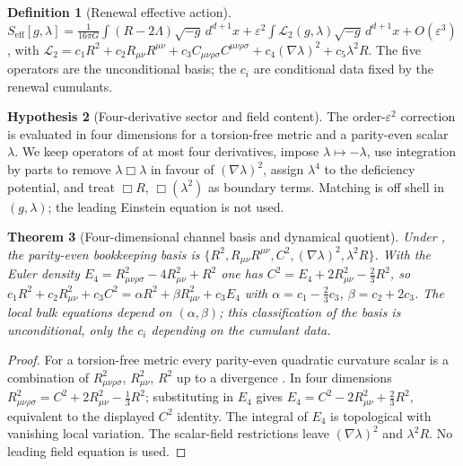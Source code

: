 \documentclass[11pt]{article}
\newtheorem{theorem}{Theorem}[section]
\theoremstyle{definition}
\newtheorem{definition}[theorem]{Definition}
\newtheorem{hypothesis}[theorem]{Hypothesis}
\theoremstyle{remark}
\newcommand{\eps}{\varepsilon}
\newcommand{\Lcal}{\mathcal L}
\newcommand{\eff}{\mathrm{eff}}
\begin{document}
\begin{definition}[Renewal effective action]
\label{def:effective-action}
$S_{\eff}[g,\lambda]=\tfrac1{16\pi G}\int(R-2\Lambda)\sqrt{-g}\,d^{d+1}x
+\eps^2\int\Lcal_2(g,\lambda)\sqrt{-g}\,d^{d+1}x+O(\eps^3)$, with
$\Lcal_2=c_1R^2+c_2R_{\mu\nu}R^{\mu\nu}+c_3C_{\mu\nu\rho\sigma}C^{\mu\nu\rho\sigma}
+c_4(\nabla\lambda)^2+c_5\lambda^2R$.  The five operators are the unconditional
basis; the $c_i$ are conditional data fixed by the renewal cumulants.
\end{definition}

\begin{hypothesis}[Four-derivative sector and field content]
\label{hyp:four-derivative-sector}
The order-$\eps^2$ correction is evaluated in four dimensions for a torsion-free
metric and a parity-even scalar $\lambda$.  We keep operators of at most four
derivatives, impose $\lambda\mapsto-\lambda$, use integration by parts to remove
$\lambda\Box\lambda$ in favour of $(\nabla\lambda)^2$, assign $\lambda^4$ to the
deficiency potential, and treat $\Box R$, $\Box(\lambda^2)$ as boundary terms.
Matching is off shell in $(g,\lambda)$; the leading Einstein equation is not used.
\end{hypothesis}

\begin{theorem}[Four-dimensional channel basis and dynamical quotient]
\label{thm:basis}
Under , the parity-even bookkeeping basis is
$\{R^2,R_{\mu\nu}R^{\mu\nu},C^2,(\nabla\lambda)^2,\lambda^2R\}$.  With the Euler
density $E_4=R_{\mu\nu\rho\sigma}^2-4R_{\mu\nu}^2+R^2$ one has
$C^2=E_4+2R_{\mu\nu}^2-\tfrac23R^2$, so
$c_1R^2+c_2R_{\mu\nu}^2+c_3C^2=\alpha R^2+\beta R_{\mu\nu}^2+c_3E_4$ with
$\alpha=c_1-\tfrac23c_3$, $\beta=c_2+2c_3$.  The local bulk equations depend on
$(\alpha,\beta)$; this classification of the basis is unconditional, only the $c_i$
depending on the cumulant data.
\end{theorem}

\begin{proof}
For a torsion-free metric every parity-even quadratic curvature scalar is a
combination of $R_{\mu\nu\rho\sigma}^2$, $R_{\mu\nu}^2$, $R^2$ up to a divergence
\cite{Stelle1977}.  In four dimensions
$R_{\mu\nu\rho\sigma}^2=C^2+2R_{\mu\nu}^2-\tfrac13R^2$; substituting in $E_4$ gives
$E_4=C^2-2R_{\mu\nu}^2+\tfrac23R^2$, equivalent to the displayed $C^2$ identity.  The
integral of $E_4$ is topological with vanishing local variation.  The scalar-field
restrictions leave $(\nabla\lambda)^2$ and $\lambda^2R$.  No leading field equation
is used.
\end{proof}
\end{document}
